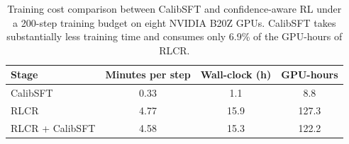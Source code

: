 \begin{table}[t]
    \centering
    \caption{Training cost comparison between CalibSFT and confidence-aware RL 
    under a 200-step training budget on eight NVIDIA B20Z GPUs. 
    CalibSFT takes substantially less training time and consumes only 6.9\% of the GPU-hours of RLCR.}
    \label{tab:training_cost}
    \footnotesize
    \begin{tabular}{lccc}
        \toprule
        Stage & Minutes per step & Wall-clock (h) & GPU-hours \\
        \midrule
        CalibSFT & 0.33 & 1.1 & 8.8 \\
        \midrule
        RLCR & 4.77 & 15.9 & 127.3 \\
        RLCR + CalibSFT & 4.58 & 15.3 & 122.2 \\
        \bottomrule
    \end{tabular}
\end{table}

